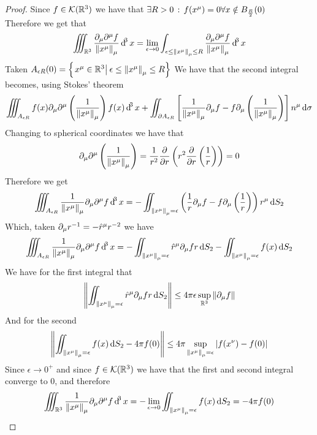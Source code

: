 \documentclass[../complete.tex]{subfiles}
\begin{document}
\begin{proof}
	Since $f\in\mathcal{K}(\mathbb{R}^3)$ we have that $\exists R>0\, :\,  f(x^\mu)=0\forall x\notin B_{\frac{R}{2}}(0)$\\
	Therefore we get that
	\begin{equation*}
		\iiint_{\mathbb{R}^3}\frac{\partial_\mu\partial^\mu f}{\norm{x^\mu}_\mu}\operatorname{d\!}^3x=\lim_{\epsilon\to0}\int_{\epsilon\le\norm{x^\mu}_\mu\le R}\frac{\partial_\mu\partial^\mu f}{\norm{x^\mu}_\mu}\operatorname{d\!}^3x
	\end{equation*}
	Taken $A_{\epsilon R}(0)=\left\{ \left.x^\mu\in\mathbb{R}^3\right|_{}\epsilon\le\norm{x^\mu}_\mu\le R \right\}$ We have that the second integral becomes, using Stokes' theorem
	\begin{equation*}
		\iiint_{A_{\epsilon R}}f(x)\partial_\mu\partial^\mu\left( \frac{1}{\norm{x^\mu}_\mu} \right)f(x)\operatorname{d\!}^3x+\iint_{\partial A_{\epsilon R}}\left[ \frac{1}{\norm{x^\mu}_\mu}\partial_\mu f-f\partial_\mu\left( \frac{1}{\norm{x^\mu}_\mu} \right) \right]n^\mu\operatorname{d\!}\sigma
	\end{equation*}
	Changing to spherical coordinates we have that
	\begin{equation*}
		\partial_\mu\partial^\mu\left( \frac{1}{\norm{x^\mu}_\mu} \right)=\frac{1}{r^2}\pdv{r}\left( r^2\pdv{r}\left( \frac{1}{r} \right) \right)=0
	\end{equation*}
	Therefore we get
	\begin{equation*}
		\iiint_{A_{\epsilon R}}\frac{1}{\norm{x^\mu}_\mu}\partial_\mu\partial^\mu f\operatorname{d\!}^3x=-\iint_{\norm{x^\mu}_\mu=\epsilon}\left( \frac{1}{r}\partial_\mu f-f\partial_\mu\left( \frac{1}{r} \right) \right)r^\mu\operatorname{d\!} S_2
	\end{equation*}
	Which, taken $\partial_{\mu}r^{-1}=-\hat{r}^\mu r^{-2}$ we have
	\begin{equation*}
		\iiint_{A_{\epsilon R}}\frac{1}{\norm{x^\mu}_\mu}\partial_\mu\partial^\mu f\operatorname{d\!}^3x=-\iint_{\norm{x^\mu}_\mu=\epsilon}\hat{r}^\mu\partial_\mu fr\operatorname{d\!} S_2-\iint_{\norm{x^\mu}_\mu=\epsilon}f(x)\operatorname{d\!} S_2
	\end{equation*}
	We have for the first integral that
	\begin{equation*}
		\norm{\iint_{\norm{x^\mu}_\mu=\epsilon}\hat{r}^\mu\partial_\mu fr\operatorname{d\!} S_2}\le4\pi\epsilon\sup_{\mathbb{R}^3}\norm{\partial_\mu f}
	\end{equation*}
	And for the second
	\begin{equation*}
		\norm{\iint_{\norm{x^\mu}_\mu=\epsilon}f(x)\operatorname{d\!} S_2-4\pi f(0)}\le4\pi\sup_{\norm{x^\mu}_\mu=\epsilon}\abs{f(x^\nu)-f(0)}
	\end{equation*}
	Since $\epsilon\to0^+$ and since $f\in\mathcal{K}(\mathbb{R}^3)$ we have that the first and second integral converge to $0$, and therefore
	\begin{equation*}
		\iiint_{\mathbb{R}^3}\frac{1}{\norm{x^\mu}_\mu}\partial_\mu\partial^\mu f\operatorname{d\!}^3x=-\lim_{\epsilon\to0}\iint_{\norm{x^\mu}_\mu=\epsilon}f(x)\operatorname{d\!} S_2=-4\pi f(0)
	\end{equation*}
\end{proof}
\end{document}
